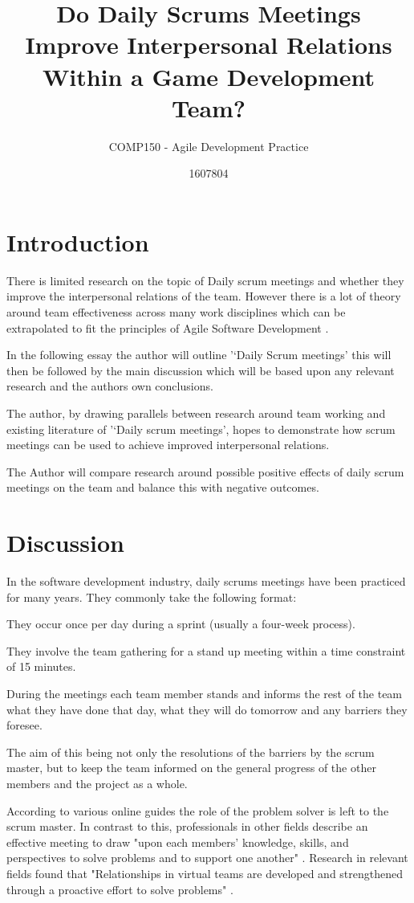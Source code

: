 \documentclass{scrartcl}
\title{Do Daily Scrums Meetings Improve Interpersonal Relations Within a Game Development Team?}
\subtitle{COMP150 - Agile Development Practice}
\author{1607804}
\begin{document}
\maketitle


\section{Introduction}
There is limited research on the topic of Daily scrum meetings and whether they improve the interpersonal relations of the team. However there is a lot of theory around team effectiveness across many work disciplines which can be extrapolated to fit the principles of Agile Software Development \cite{Agile}. 

In the following essay the author will outline '‘Daily Scrum meetings' this will then be followed by the main discussion which will be based upon any relevant research and the authors own conclusions. 

The author, by drawing parallels between research around team working and existing literature of '‘Daily scrum meetings', hopes to demonstrate how scrum meetings can be used to achieve improved interpersonal relations. 

The Author will compare research around possible positive effects of daily scrum meetings on the team and balance this with negative outcomes. 


\section{Discussion}
In the software development industry, daily scrums meetings have been practiced for many years. They commonly take the following format:

They occur once per day during a sprint (usually a four-week process). 

They involve the team gathering for a stand up meeting within a time constraint of 15 minutes. 

During the meetings each team member stands and informs the rest of the team what they have done that day, what they will do tomorrow and any barriers they foresee.

The aim of this being not only the resolutions of the barriers by the scrum master, but to keep the team informed on the general progress of the other members and the project as a whole. 

According to various online guides  \cite{ DailyScrum, EffectiveScrum} the role of the problem solver is left to the scrum master. In contrast to this, professionals in other fields describe an effective meeting to draw "upon each members' knowledge, skills, and perspectives to solve problems and to support one another" \cite{LeadershipLesson}. Research in relevant fields found that "Relationships in virtual teams are developed and strengthened through a proactive effort to solve problems" \cite[p. 559]{tavvcar2005skills}. 
\end{document}

